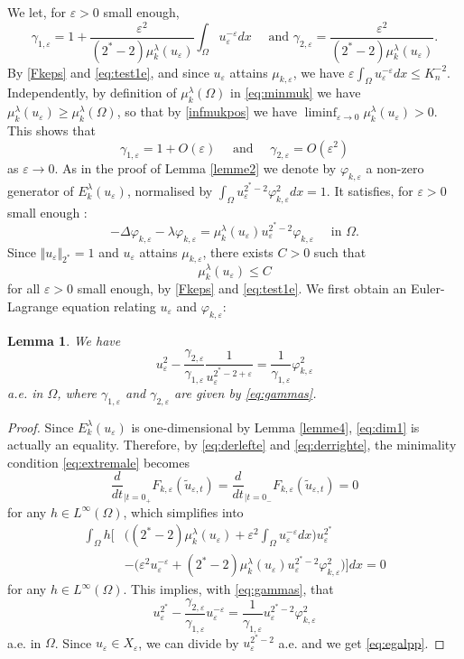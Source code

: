 \documentclass[10pt]{amsart}
\numberwithin{equation}{section}
\newcommand{\ve}{\varepsilon}
\newcommand{\vp}{\varphi}
\newcommand{\Om}{\Omega}
\newcommand{\ben}{\begin{equation}}
\newcommand{\een}{\end{equation}}
\newcommand{\mkl}{\mu_{k}^{\lambda}}
\newcommand{\mkle}{\mu_{k,\ve}}
\newcommand{\Fke}{F_{k,\ve}}
\theoremstyle{plain}
\newtheorem{lemme}{Lemma}[section]%
\theoremstyle{remark}
\begin{document}
We let, for $\ve >0$ small enough,
\ben  \label{eq:gammas} \gamma_{1,\ve}=1 + \frac{\ve^2}{(2^*-2) \mkl(u_\ve)} \int_{\Om} u_\ve^{-\ve}dx \quad \text{ and } \gamma_{2,\ve} = \frac{\ve^2}{(2^*-2) \mkl(u_\ve)}. 
\een
By \eqref{Fkeps} and \eqref{eq:test1e}, and since $u_\ve$ attains $\mkle$, we have $ \ve \int_\Om u_\ve^{-\ve} dx \le K_n^{-2}$. Independently, by definition of $\mkl(\Om)$ in \eqref{eq:minmuk} we have $\mkl(u_\ve) \ge \mkl(\Om)$, so that by \eqref{infmukpos} we have $\liminf_{\ve\to0} \mkl(u_\ve) >0$. This shows that 
\begin{equation*}
\gamma_{1,\ve} = 1 + O(\ve) \quad \text{ and } \quad \gamma_{2,\ve} = O(\ve^2) 
\end{equation*}
 as $\ve \to 0$. As in the proof of Lemma \ref{lemme2} we denote by $\vp_{k,\ve}$ a non-zero generator of $E_k^{\lambda}(u_\ve)$, normalised by $ \int_{\Om}u_\ve^{2^*-2} \vp_{k,\ve}^2dx = 1$. It satisfies, for $\ve>0$ small enough :
\begin{equation} \label{eq:vpke}
 - \Delta \vp_{k,\ve} - \lambda \vp_{k,\ve} = \mkl(u_\ve) u_\ve^{2^*-2} \vp_{k,\ve} \quad \text{ in } \Om. 
 \end{equation}
Since $\Vert u_\ve \Vert_{2^*} = 1$ and $u_\ve$ attains $\mkle$, there exists $C>0$ such that 
\begin{equation} \label{controle:muke}
\mkl(u_\ve) \le C 
\end{equation}
for all $\ve >0$ small enough, by  \eqref{Fkeps} and \eqref{eq:test1e}. We first obtain an Euler-Lagrange equation relating $u_\ve$ and $\vp_{k,\ve}$:


\begin{lemme} \label{lemme4bis}
We have 
 \begin{equation} \label{eq:egalpp}
  u_\ve^2 - \frac{\gamma_{2,\ve}}{\gamma_{1,\ve}} \frac{1}{u_\ve^{2^*-2+\ve}} = \frac{1}{\gamma_{1,\ve}} \vp_{k,\ve}^2 
  \end{equation}
a.e. in $\Om$, where $\gamma_{1,\ve}$ and $\gamma_{2,\ve}$ are given by \eqref{eq:gammas}. 
\end{lemme}
\begin{proof} 
Since $E_k^{\lambda}(u_\ve)$ is one-dimensional by Lemma \ref{lemme4}, \eqref{eq:dim1} is actually an equality. Therefore, by \eqref{eq:derlefte} and \eqref{eq:derrighte}, the minimality condition \eqref{eq:extremale} becomes
$$   \frac{d}{dt}_{|t=0_+} \Fke(\tilde{u}_{\ve,t})  = \frac{d}{dt}_{|t=0_-} \Fke(\tilde{u}_{\ve,t}) = 0$$
for any $h \in L^\infty(\Om)$, which simplifies into 
$$ \begin{aligned}
\int_{\Om} h \Bigg[ &\Big( (2^*-2) \mkl(u_\ve) + \ve^2 \int_{\Om} u_\ve^{-\ve} dx \Big) u_\ve^{2^*} \\
 &- \Big(\ve^2 u_\ve^{-\ve} + (2^*-2) \mkl(u_\ve) u_\ve^{2^*-2} \vp_{k,\ve}^2 \Big)\Bigg]dx = 0
 \end{aligned} $$
 for any $h \in L^\infty(\Om)$. This implies, with \eqref{eq:gammas}, that
 $$u_\ve^{2^*} - \frac{\gamma_{2,\ve}}{\gamma_{1,\ve}} u_\ve^{-\ve} = \frac{1}{\gamma_{1,\ve}} u_\ve^{2^*-2} \vp_{k,\ve}^2 $$
 a.e. in $\Om$. Since $u_\ve \in X_\ve$, we can divide by $u_\ve^{2^*-2}$ a.e. and we get \eqref{eq:egalpp}. 
\end{proof}
 
\end{document}
